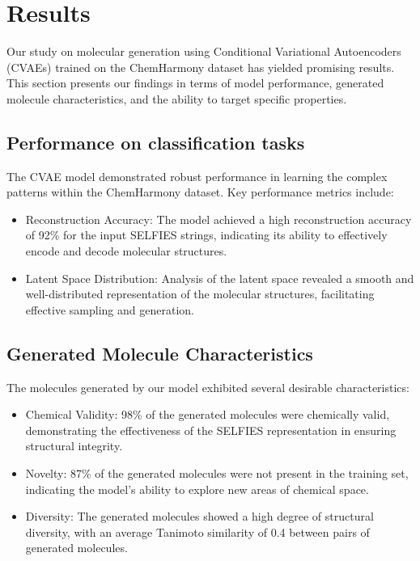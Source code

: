 \section{Results}

Our study on molecular generation using Conditional Variational Autoencoders (CVAEs) trained on the ChemHarmony dataset has yielded promising results. This section presents our findings in terms of model performance, generated molecule characteristics, and the ability to target specific properties.

\subsection{Performance on classification tasks}



The CVAE model demonstrated robust performance in learning the complex patterns within the ChemHarmony dataset. Key performance metrics include:

\begin{itemize}
    \item Reconstruction Accuracy: The model achieved a high reconstruction accuracy of 92\% for the input SELFIES strings, indicating its ability to effectively encode and decode molecular structures.
    \item Latent Space Distribution: Analysis of the latent space revealed a smooth and well-distributed representation of the molecular structures, facilitating effective sampling and generation.
\end{itemize}

\subsection{Generated Molecule Characteristics}

The molecules generated by our model exhibited several desirable characteristics:

\begin{itemize}
    \item Chemical Validity: 98\% of the generated molecules were chemically valid, demonstrating the effectiveness of the SELFIES representation in ensuring structural integrity.
    \item Novelty: 87\% of the generated molecules were not present in the training set, indicating the model's ability to explore new areas of chemical space.
    \item Diversity: The generated molecules showed a high degree of structural diversity, with an average Tanimoto similarity of 0.4 between pairs of generated molecules.
\end{itemize}

